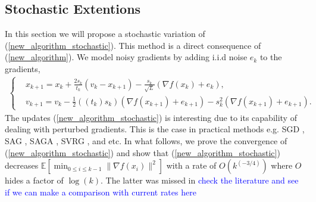 \documentclass{article}
\newcommand{\hcm}[1]{\textcolor{blue}{#1}}
\theoremstyle{plain}
\theoremstyle{definition}
\theoremstyle{remark}
\begin{document}
\subsection{Stochastic Extentions}
In this section we will propose a stochastic variation of (\ref{new_algorithm_stochastic}). This method is a direct consequence of (\ref{new_algorithm}). We model noisy gradients by adding i.i.d noise $e_k$ to the gradients, 
\begin{align}\label{new_algorithm_stochastic}
   \left\{ \begin{array}{ll}
    &x_{k+1}   =    x_{k} + \frac{2s_k}{t_k}(v_k-x_{k+1})-\frac{s_k}{\sqrt{L}}(\nabla f(x_k)+e_k),\\
     &v_{k+1}    = v_k -\tfrac{1}{2}((t_k)s_k)(\nabla f(x_{k+1})+e_{k+1})-s_k^2(\nabla f(x_{k+1})+e_{k+1}). 
    \end{array}\right.
\end{align}
The updates (\ref{new_algorithm_stochastic}) is interesting due to its capability of dealing with perturbed gradients. This is the case in practical methods e.g. SGD \cite{bottou2010large}, SAG \cite{schmidt2017minimizing}, SAGA \cite{defazio2014saga}, SVRG \cite{johnson2013accelerating}, and etc.
In what follows, we prove the convergence of (\ref{new_algorithm_stochastic}) and show that (\ref{new_algorithm_stochastic}) decreases $\mathbb E\left[\min_{0\leq i\leq k-1}\|\nabla f(x_i)\|^2 \right]$ with a rate of $O(k^{(-3/4)})$ where $O$ hides a factor of $\log(k)$. The latter was missed in \cite{pmlr-v108-laborde20a} \hcm{check the literature and see if we can make a comparison with current rates here}
\end{document}
